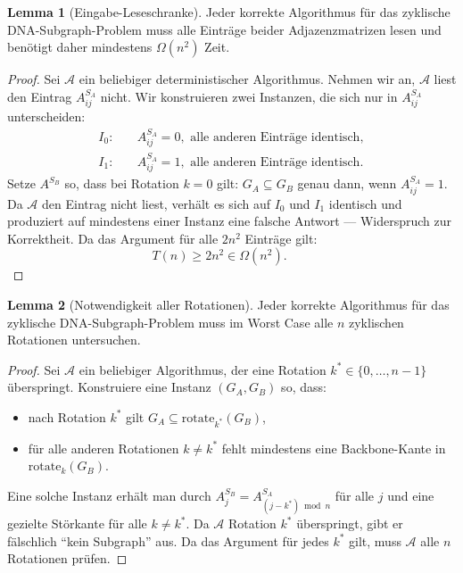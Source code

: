 ﻿\documentclass[a4paper,12pt]{article}
\theoremstyle{definition}
\newtheorem{lemma}{Lemma}
\begin{document}
\begin{lemma}[Eingabe-Leseschranke]
    \label{lem:eingabe}
    Jeder korrekte Algorithmus für das zyklische DNA-Subgraph-Problem muss alle
    Einträge beider Adjazenzmatrizen lesen und benötigt daher mindestens
    $\Omega(n^2)$ Zeit.
\end{lemma}

\begin{proof}
    Sei $\mathcal{A}$ ein beliebiger deterministischer Algorithmus.
    Nehmen wir an, $\mathcal{A}$ liest den Eintrag $A^{S_A}_{ij}$ nicht.
    Wir konstruieren zwei Instanzen, die sich nur in $A^{S_A}_{ij}$ unterscheiden:
    \begin{align*}
        I_0: & \quad A^{S_A}_{ij} = 0, \text{ alle anderen Einträge identisch}, \\
        I_1: & \quad A^{S_A}_{ij} = 1, \text{ alle anderen Einträge identisch}.
    \end{align*}
    Setze $A^{S_B}$ so, dass bei Rotation $k = 0$ gilt:
    $G_A \subseteq G_B$ genau dann, wenn $A^{S_A}_{ij} = 1$.
    Da $\mathcal{A}$ den Eintrag nicht liest, verhält es sich auf $I_0$ und $I_1$
    identisch und produziert auf mindestens einer Instanz eine falsche Antwort ---
    Widerspruch zur Korrektheit. Da das Argument für alle $2n^2$ Einträge gilt:
    \[
        T(n) \geq 2n^2 \in \Omega(n^2). \qquad 
    \]
\end{proof}

\begin{lemma}[Notwendigkeit aller Rotationen]
    \label{lem:rotationen}
    Jeder korrekte Algorithmus für das zyklische DNA-Subgraph-Problem muss im
    Worst Case alle $n$ zyklischen Rotationen untersuchen.
\end{lemma}

\begin{proof}
    Sei $\mathcal{A}$ ein beliebiger Algorithmus, der eine Rotation
    $k^* \in \{0, \ldots, n-1\}$ überspringt.
    Konstruiere eine Instanz $(G_A, G_B)$ so, dass:
    \begin{itemize}
        \item nach Rotation $k^*$ gilt $G_A \subseteq \mathrm{rotate}_{k^*}(G_B)$,
        \item für alle anderen Rotationen $k \neq k^*$ fehlt mindestens eine
              Backbone-Kante in $\mathrm{rotate}_k(G_B)$.
    \end{itemize}
    Eine solche Instanz erhält man durch $A^{S_B}_j = A^{S_A}_{(j-k^*)\bmod n}$
    für alle $j$ und eine gezielte Störkante für alle $k \neq k^*$.
    Da $\mathcal{A}$ Rotation $k^*$ überspringt, gibt er fälschlich
    ``kein Subgraph'' aus. Da das Argument für jedes $k^*$ gilt, muss
    $\mathcal{A}$ alle $n$ Rotationen prüfen. 
\end{proof}
\end{document}
